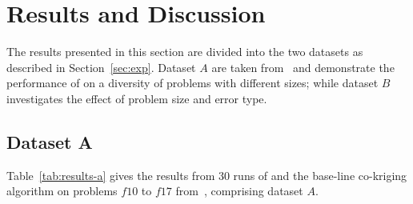 \section{Results and Discussion}\label{sec:results}
The results presented in this section are divided into the two datasets as described in Section~\ref{sec:exp}. Dataset $A$ are taken from~\cite{lv2021multi} and demonstrate the performance of \AlgName{} on a diversity of problems with different sizes; while dataset $B$ investigates the effect of problem size and error type.

\subsection*{Dataset A}

Table~\ref{tab:results-a} gives the results from 30 runs of \AlgName{} and the base-line co-kriging algorithm on problems $f10$ to $f17$ from~\cite{lv2021multi}, comprising dataset $A$.

